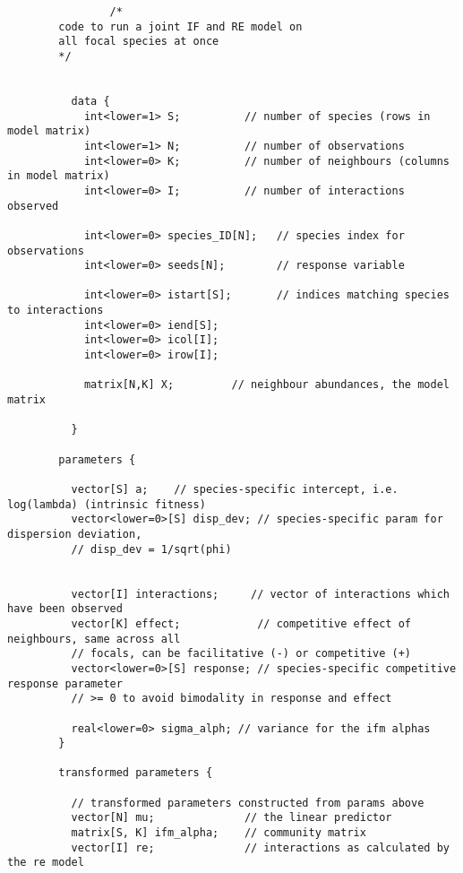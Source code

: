 \documentclass[a4,12pt]{article}
\begin{document}
\begin{adjustwidth}{-150pt}{}
    \begin{lstlisting}
                /* 
        code to run a joint IF and RE model on 
        all focal species at once
        */ 
          
          
          data {
            int<lower=1> S;          // number of species (rows in model matrix)
            int<lower=1> N;          // number of observations
            int<lower=0> K;          // number of neighbours (columns in model matrix)
            int<lower=0> I;          // number of interactions observed
            
            int<lower=0> species_ID[N];   // species index for observations
            int<lower=0> seeds[N];        // response variable 
            
            int<lower=0> istart[S];       // indices matching species to interactions
            int<lower=0> iend[S];
            int<lower=0> icol[I];
            int<lower=0> irow[I];
            
            matrix[N,K] X;         // neighbour abundances, the model matrix
          
          } 

        parameters {
          
          vector[S] a;    // species-specific intercept, i.e. log(lambda) (intrinsic fitness)
          vector<lower=0>[S] disp_dev; // species-specific param for dispersion deviation, 
          // disp_dev = 1/sqrt(phi) 
          
          
          vector[I] interactions;     // vector of interactions which have been observed
          vector[K] effect;            // competitive effect of neighbours, same across all 
          // focals, can be facilitative (-) or competitive (+)
          vector<lower=0>[S] response; // species-specific competitive response parameter
          // >= 0 to avoid bimodality in response and effect  

          real<lower=0> sigma_alph; // variance for the ifm alphas
        } 

        transformed parameters {
          
          // transformed parameters constructed from params above
          vector[N] mu;              // the linear predictor
          matrix[S, K] ifm_alpha;    // community matrix 
          vector[I] re;              // interactions as calculated by the re model
          

\end{lstlisting}
\end{adjustwidth}
\end{document}
